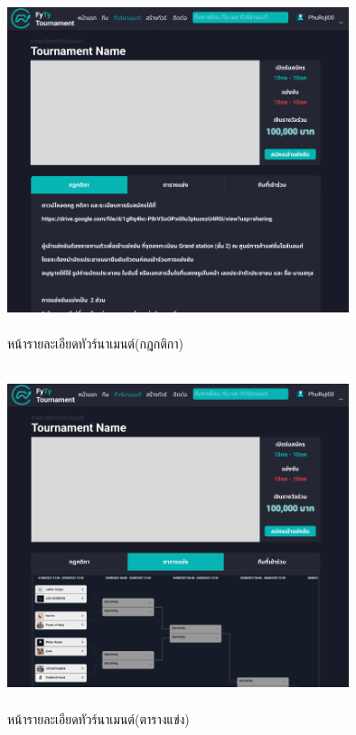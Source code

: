 \begin{figure}[h]
  \begin{center}
  \includegraphics[width=10cm,height=10cm,keepaspectratio]{tourRule.png}
  \end{center}
  \caption[หน้ารายละเอียดทัวร์นาเมนต์(กฎกติกา)]{หน้ารายละเอียดทัวร์นาเมนต์(กฎกติกา)}
  \label{fig:หน้ารายละเอียดทัวร์นาเมนต์(กฎกติกา)}
\end{figure}

\begin{figure}[h]
  \begin{center}
  \includegraphics[width=10cm,height=10cm,keepaspectratio]{tourBac.png}
  \end{center}
  \caption[หน้ารายละเอียดทัวร์นาเมนต์(ตารางแข่ง)]{หน้ารายละเอียดทัวร์นาเมนต์(ตารางแข่ง)}
  \label{fig:หน้ารายละเอียดทัวร์นาเมนต์(ตารางแข่ง)}
\end{figure}

